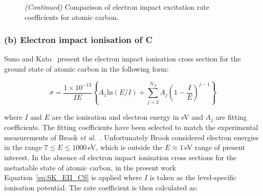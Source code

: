 \begin{figure}[!t]
 \centering
 \ContinuedFloat
 \caption{\textit{(Continued)} Comparison of  electron impact excitation rate coefficients for atomic carbon.}
 \label{fig:K_EIE_C}
\end{figure}

\subsubsection{(b) Electron impact ionisation of C}

Suno and Kato~\cite{SK2006} present the electron impact ionisation cross section for the ground state of atomic carbon in the following form:

\begin{equation}
 \sigma = \frac{1 \times 10^{-13}}{I E} \left \lbrace A_1 \text{ln} \left ( E / I \right ) + \sum_{j=2}^{N_A} A_j \left ( 1 - \frac{I}{E} \right )^{j-1} \right \rbrace \label{eq:SK_EII_CS}
\end{equation}

\noindent where $I$ and $E$ are the ionisation and electron energy in eV and $A_j$ are fitting coefficients.
The fitting coefficients have been selected to match the experimental measurements of Brook \textit{et al.}~\cite{BHS1978}.
Unfortunately Brook considered electron energies in the range $ 7 \leq E \leq 1000$\,eV, which is outside the $E \approx 1$\,eV range of present interest.
In the absence of electron impact ionisation cross sections for the metastable state of atomic carbon, in the present work Equation~\ref{eq:SK_EII_CS} is applied where $I$ is taken as the level-specific ionisation potential.
The rate coefficient is then calculated as:

